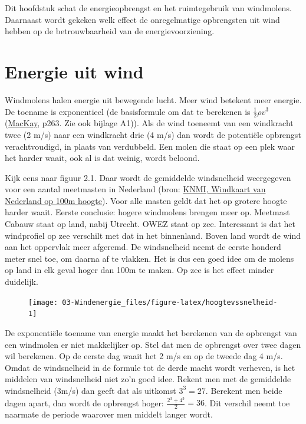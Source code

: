 \documentclass[
  11pt,
  a4paper,
]{book}
\begin{document}
Dit hoofdstuk schat de energieopbrengst en het ruimtegebruik van windmolens. Daarnaast wordt gekeken welk effect de onregelmatige opbrengsten uit wind hebben op de betrouwbaarheid van de energievoorziening.

\hypertarget{energie-uit-wind}{%
\section{Energie uit wind}\label{energie-uit-wind}}

Windmolens halen energie uit bewegende lucht. Meer wind betekent meer energie. De toename is exponentieel (de basisformule om dat te berekenen is \(\frac{1}{2} \rho v^3\) (\href{https://www.withouthotair.com/download.html}{MacKay}, p263. Zie ook bijlage A1)). Als de wind toeneemt van een windkracht twee (2 m/s) naar een windkracht drie (4 m/s) dan wordt de potentiële opbrengst verachtvoudigd, in plaats van verdubbeld. Een molen die staat op een plek waar het harder waait, ook al is dat weinig, wordt beloond.

Kijk eens naar figuur 2.1. Daar wordt de gemiddelde windsnelheid weergegeven voor een aantal meetmasten in Nederland (bron: \href{https://www.knmiprojects.nl/binaries/knmiprojects/documents/publications/2014/12/01/knmi-windkaart-van-100-m-hoogte/KNMI+-+Windkaart+van+100+m+hoogte.pdf}{KNMI, Windkaart van Nederland op 100m hoogte}). Voor alle masten geldt dat het op grotere hoogte harder waait. Eerste conclusie: hogere windmolens brengen meer op. Meetmast Cabauw staat op land, nabij Utrecht. OWEZ staat op zee. Interessant is dat het windprofiel op zee verschilt met dat in het binnenland. Boven land wordt de wind aan het oppervlak meer afgeremd. De windsnelheid neemt de eerste honderd meter snel toe, om daarna af te vlakken. Het is dus een goed idee om de molens op land in elk geval hoger dan 100m te maken. Op zee is het effect minder duidelijk.

\begin{figure}[t]

{\centering \texttt{[image: 03-Windenergie\_files/figure-latex/hoogtevssnelheid-1]} 

}

\end{figure}

De exponentiële toename van energie maakt het berekenen van de opbrengst van een windmolen er niet makkelijker op. Stel dat men de opbrengst over twee dagen wil berekenen. Op de eerste dag waait het 2 m/s en op de tweede dag 4 m/s. Omdat de windsnelheid in de formule tot de derde macht wordt verheven, is het middelen van windsnelheid niet zo'n goed idee. Rekent men met de gemiddelde windsnelheid (3m/s) dan geeft dat als uitkomst \(3^3 = 27\). Berekent men beide dagen apart, dan wordt de opbrengst hoger: \(\frac{2^3 + 4^3}{2} = 36\). Dit verschil neemt toe naarmate de periode waarover men middelt langer wordt.
\end{document}
